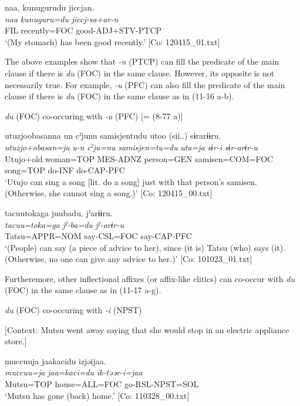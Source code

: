     
      \glll    naa,  kunugurudu  jiccjan.\\
      \textit{naa}  \textit{kunuguru=du}  \textit{jiccj-sa+ar-n}\\
      FIL  recently=FOC  good-ADJ+STV-PTCP\\
    \glt       ‘(My stomach) has been good recently.’ [Co: 120415\_01.txt]
\z
\z

The above examples show that \textit{-n} (PTCP) can fill the predicate of the main clause if there is \textit{du} (FOC) in the same clause. However, its opposite is not necessarily true. For example, \textit{{}-u} (PFC) can also fill the predicate of the main clause if there is \textit{du} (FOC) in the same clause as in (11-16 a-b).

\ea\label{ex:11-16}  \textit{du} (FOC) co-occuring with \textit{{}-u} (PFC) [= (8-77 a)]

  \ea  
      \glll    utuzjoobasanna  un  cˀjunu  samisjentudu  utoo  (sii..)  sɨrarɨɨru.  \\
      \textit{utuzjo+obasan=ja}  \textit{u-n}  \textit{cˀju=nu}  \textit{samisjen=tu=du}  \textit{uta=ja}  \textit{sɨr-i}  \textit{sɨr-arɨr-u}  \\
      Utujo+old.woman=TOP  MES-ADNZ  person=GEN  samisen=COM=FOC song=TOP  do-INF  do-CAP-PFC  \\
      \glt       ‘Utujo can sing a song [lit. do a song] just with that person’s samisen. (Otherwise, she cannot sing a song.)’ [Co: 120415\_00.txt]

  \ex  
      \glll    tacuu{\textbar}toka{\textbar}ga  juubadu,  jˀarɨɨru.\\
      \textit{tacuu=toka=ga}  \textit{jˀ-ba=du}  \textit{jˀ-arɨr-u}\\
      Tatsu=APPR=NOM  say-CSL=FOC  say-CAP-PFC\\
      \glt       ‘(People) can say (a piece of advice to her), since (it is) Tatsu (who) says (it). (Otherwise, no one can give any advice to her.)’ [Co: 101023\_01.txt]
\z
\z

  Furtheremore, other inflectional affixes (or affix-like clitics) can co-occur with \textit{du} (FOC) in the same clause as in (11-17 a-g).

\ea\label{ex:11-17}  \ea \textit{du} (FOC) co-occuring with \textit{{}-i} (NPST)

  [Context: Mutsu went away saying that she would stop in an electric appliance store.]

  
      \glll    muccuuja  jaakacidu  izjəijaa.\\
    \textit{muccuu=ja}  \textit{jaa=kaci=du}  \textit{ik-təər-i=jaa}\\
    Mutsu=TOP  house=ALL=FOC  go-RSL-NPST=SOL\\
\glt     ‘Mutsu has gone (back) home.’ [Co: 110328\_00.txt]

